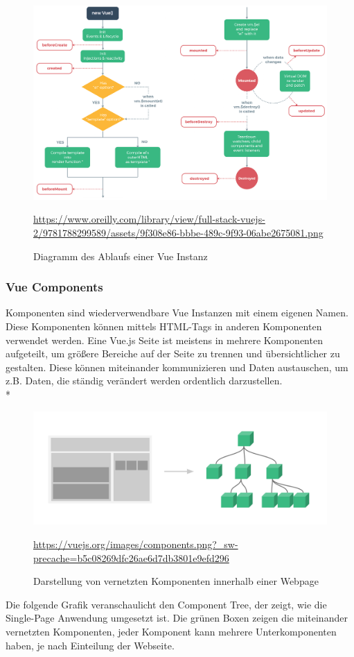 \begin{figure}[htp]
    \centering
    \includegraphics[scale=0.3]{pics/VueInstanceLifeCycle.png}
    \caption{Diagramm des Ablaufs einer Vue Instanz}
        \small \url{https://www.oreilly.com/library/view/full-stack-vuejs-2/9781788299589/assets/9f308e86-bbbe-489c-9f93-06abe2675081.png}
    \label{fig:impl:VueInstanceLifeCycle}
\end{figure}


\subsubsection{Vue Components}
Komponenten sind wiederverwendbare Vue Instanzen mit einem eigenen Namen. Diese Komponenten können mittels HTML-Tags in anderen Komponenten verwendet werden.
Eine Vue.js Seite ist meistens in mehrere Komponenten aufgeteilt, um größere Bereiche auf der Seite zu trennen und übersichtlicher zu gestalten. Diese können miteinander 
kommunizieren und Daten austauschen, um z.B. Daten, die ständig verändert werden ordentlich darzustellen.\cite{VueGuideComponents} \\*
\begin{figure}[htp]
    \centering
    \includegraphics[scale=0.3]{pics/NestedComponentsTree.png}
    \caption{Darstellung von vernetzten Komponenten innerhalb einer Webpage}
        \small \url{https://vuejs.org/images/components.png?_sw-precache=b5c08269dfc26ae6d7db3801e9efd296}
    \label{fig:impl:NestedComponentsTree}
\end{figure}
Die folgende Grafik veranschaulicht den Component Tree, der zeigt, wie die Single-Page Anwendung umgesetzt ist. 
Die grünen Boxen zeigen die miteinander vernetzten Komponenten, jeder Komponent kann mehrere Unterkomponenten haben, je nach Einteilung der Webseite.

